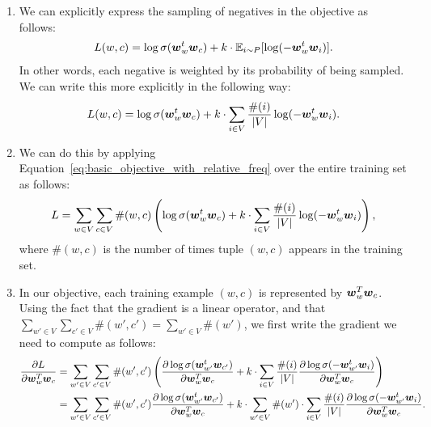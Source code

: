 \documentclass[11pt,a4paper]{article}
\begin{document}
\begin{enumerate}[label=(\alph*)]
    \item We can explicitly express the sampling of negatives in the objective
          as follows:
          \begin{align}\label{eq:basic_objective_with_expectation}
              L(w,c) = \log \sigma({\boldsymbol{w}}_w^t{\boldsymbol{w}}_c) + k\cdot \mathbb{E}_{i\sim P}[\log(-{\boldsymbol{w}}_w^t{\boldsymbol{w}}_i)].
          \end{align}
          In other words, each negative is weighted by its probability of being
          sampled.
          We can write this more explicitly in the following way:
          \begin{align}\label{eq:basic_objective_with_relative_freq}
              L(w,c) = \log \sigma({\boldsymbol{w}}_w^t{\boldsymbol{w}}_c) + k\cdot \sum_{i\in V} \frac{\#(i)}{|V|}\log(-{\boldsymbol{w}}_w^t{\boldsymbol{w}}_i).
          \end{align}
    \item We can do this by applying
          Equation~\ref{eq:basic_objective_with_relative_freq} over the entire
          training set as follows:
          \begin{align}\label{eq:general_objective_with_relative_freq}
              L = \sum_{w\in V} \sum_{c\in V} \#(w,c)\left(\log \sigma({\boldsymbol{w}}_w^t{\boldsymbol{w}}_c) + k\cdot \sum_{i\in V} \frac{\#(i)}{|V|}\log(-{\boldsymbol{w}}_w^t{\boldsymbol{w}}_i)\right),
          \end{align}
          where $\#(w,c)$ is the number of times tuple $(w,c)$ appears in the
          training set.
    \item In our objective, each training example $(w,c)$ is represented by
          ${\boldsymbol{w}}_w^T{\boldsymbol{w}}_c$.
          Using the fact that the gradient is a linear operator, and that
          $\sum_{w'\in V} \sum_{c'\in V} \#(w',c') = \sum_{w'\in V}\#(w')$,
          we first write the gradient we need to compute as follows:
          \begin{align*}
              \frac{\partial L}{\partial \vw_w^T\vw_c} & = \sum_{w'\in V} \sum_{c'\in V} \#(w',c')\left(\frac{\partial \log \sigma(\vw_{w'}^t\vw_{c'})}{\partial \vw_w^T\vw_c} + k\cdot \sum_{i\in V} \frac{\#(i)}{|V|}\frac{\partial \log\sigma(-\vw_{w'}^t\vw_i)}{\partial \vw_w^T\vw_c}\right)              \\
                                                       & = \sum_{w'\in V} \sum_{c'\in V} \#(w',c')\frac{\partial \log \sigma(\vw_{w'}^t\vw_{c'})}{\partial \vw_w^T\vw_c} + k\cdot\sum_{w'\in V} \#(w')\cdot\sum_{i\in V} \frac{\#(i)}{|V|}\frac{\partial \log\sigma(-\vw_{w'}^t\vw_i)}{\partial \vw_w^T\vw_c}.

\end{align*}
\end{enumerate}
\end{document}
